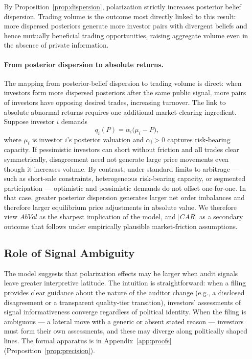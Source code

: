 \documentclass[12pt]{article}
\begin{document}
By Proposition~\ref{prop:dispersion}, polarization strictly increases
posterior belief dispersion. Trading volume is the outcome most directly
linked to this result: more dispersed posteriors generate more investor
pairs with divergent beliefs and hence mutually beneficial trading
opportunities, raising aggregate volume even in the absence of private
information.

\paragraph{From posterior dispersion to absolute returns.}
The mapping from posterior-belief dispersion to trading volume is direct:
when investors form more dispersed posteriors after the same public signal,
more pairs of investors have opposing desired trades, increasing turnover.
The link to absolute abnormal returns requires one additional
market-clearing ingredient. Suppose investor $i$ demands
\[
    q_i(P) = \alpha_i\bigl(\mu_i - P\bigr),
\]
where $\mu_i$ is investor $i$'s posterior valuation and $\alpha_i > 0$
captures risk-bearing capacity. If pessimistic investors can short without
friction and all trades clear symmetrically, disagreement need not generate
large price movements even though it increases volume. By contrast, under
standard limits to arbitrage --- such as short-sale constraints,
heterogeneous risk-bearing capacity, or segmented participation
\citep{miller1977, hong2003, gromb2010} --- optimistic and pessimistic
demands do not offset one-for-one. In that case, greater posterior
dispersion generates larger net order imbalances and therefore larger
equilibrium price adjustments in absolute value. We therefore view $AbVol$
as the sharpest implication of the model, and $|CAR|$ as a secondary
outcome that follows under empirically plausible market-friction
assumptions.

\subsection{Role of Signal Ambiguity}
\label{sec:ambiguity}

The model suggests that polarization effects may be larger when audit
signals leave greater interpretive latitude. The intuition is
straightforward: when a filing provides clear guidance about the nature
of the auditor change (e.g., a disclosed disagreement or a transparent
quality-tier transition), investors' assessments of signal
informativeness converge regardless of political identity. When the
filing is ambiguous --- a lateral move with a generic or absent stated
reason --- investors must form their own assessments, and these may
diverge along politically shaped lines. The formal apparatus is in
Appendix~\ref{app:proofs} (Proposition~\ref{prop:precision}).
\end{document}
